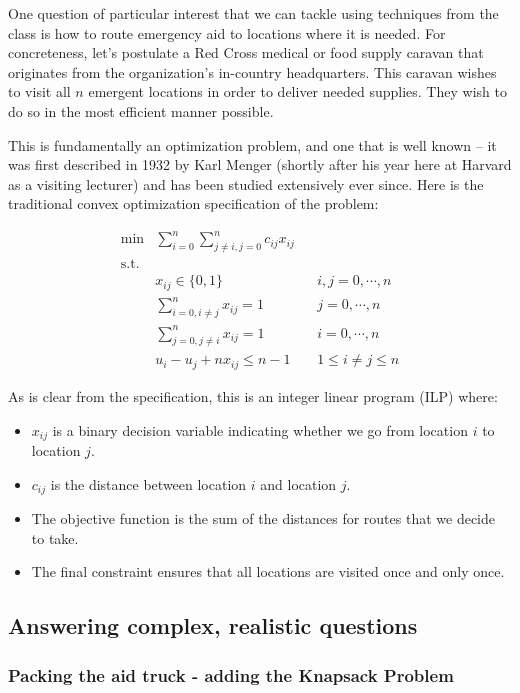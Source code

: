 \documentclass{article} %
\begin{document}
One question of particular interest that we can tackle using techniques from the class is how to route emergency aid
to locations where it is needed.  For concreteness, let's postulate a Red Cross medical or food supply caravan that originates
from the organization's in-country headquarters. This caravan wishes to visit all $n$ emergent locations in order to
deliver needed supplies. They wish to do so in the most efficient manner possible.

This is fundamentally an optimization problem, and one that is well known -- it was first described in 1932 by Karl Menger (shortly after his year here at Harvard as a visiting lecturer) and has been studied extensively ever since.\cite{Menger} Here is the traditional convex optimization specification of the problem:\cite{Winston}


\begin{align*}
\min &\sum_{i=0}^n \sum_{j\ne i,j=0}^nc_{ij}x_{ij} &&  \\
\mathrm{s.t.} & \\
	& x_{ij} \in \{0, 1\} && i,j=0, \cdots, n \\
	& \sum_{i=0,i\ne j}^n x_{ij} = 1 && j=0, \cdots, n \\
	& \sum_{j=0,j\ne i}^n x_{ij} = 1 && i=0, \cdots, n \\
	&u_i-u_j +nx_{ij} \le n-1 && 1 \le i \ne j \le n
\end{align*}

As is clear from the specification, this is an integer linear program (ILP) where:

\begin{itemize}
  \item $x_{ij}$ is a binary decision variable indicating whether we go from location $i$ to location $j$.
  \item $c_{ij}$ is the distance between location $i$ and location $j$.
  \item The objective function is the sum of the distances for routes that we decide to take.
  \item The final constraint ensures that all locations are visited once and only once.
\end{itemize}

\subsection*{Answering complex, realistic questions}

\subsubsection*{Packing the aid truck - adding the Knapsack Problem}
\end{document}
